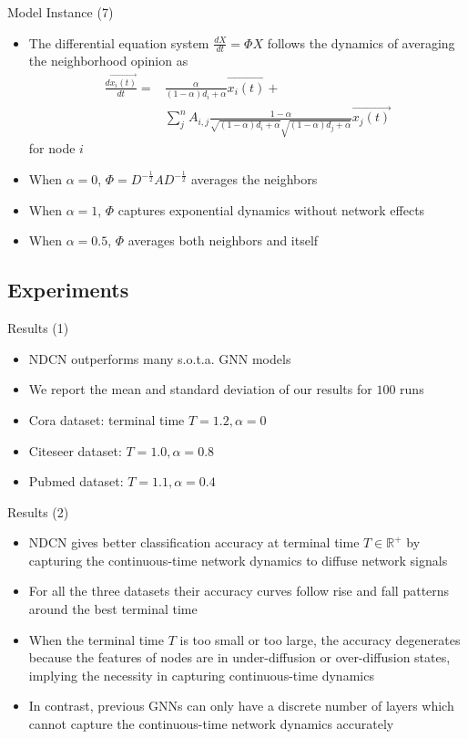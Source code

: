 \documentclass{beamer}
\begin{document}
\begin{frame}{Model Instance (7)}
\begin{itemize}
\item The differential equation system $\frac{dX}{dt}=\Phi X$ follows the dynamics of averaging the neighborhood opinion as\[
\begin{split}
\frac{d\overrightarrow{x_i(t)}}{dt}=&\frac{\alpha}{(1-\alpha)d_i+\alpha}\overrightarrow{x_i(t)}+\\
&\sum_j^n A_{i,j}\frac{1-\alpha}{\sqrt{(1-\alpha)d_i+\alpha}\sqrt{(1-\alpha)d_j+\alpha}}\overrightarrow{x_j(t)}
\end{split}
\]for node $i$
\item When $\alpha=0$, $\Phi=D^{-\frac{1}{2}}AD^{-\frac{1}{2}}$ averages the neighbors
\item When $\alpha=1$, $\Phi$ captures exponential dynamics without network effects
\item When $\alpha=0.5$, $\Phi$ averages both neighbors and itself
\end{itemize}
\end{frame}

\subsection{Experiments}
\begin{frame}{Results (1)}
\begin{itemize}
\item NDCN outperforms many s.o.t.a. GNN models
\item We report the mean and standard deviation of our results for $100$ runs
\item Cora dataset: terminal time $T=1.2,\alpha=0$
\item Citeseer dataset: $T=1.0,\alpha=0.8$
\item Pubmed dataset: $T=1.1,\alpha=0.4$
\end{itemize}
\end{frame}

\begin{frame}{Results (2)}
\begin{itemize}
\item NDCN gives better classification accuracy at terminal time $T\in\mathbb{R}^+$ by capturing the continuous-time network dynamics to diffuse network signals
\item For all the three datasets their accuracy curves follow rise and fall patterns around the best terminal time
\item When the terminal time $T$ is too small or too large, the accuracy degenerates because the features of nodes are in under-diffusion or over-diffusion states, implying the necessity in capturing continuous-time dynamics
\item In contrast, previous GNNs can only have a discrete number of layers which cannot capture the continuous-time network dynamics accurately
\end{itemize}
\end{frame}
\end{document}
